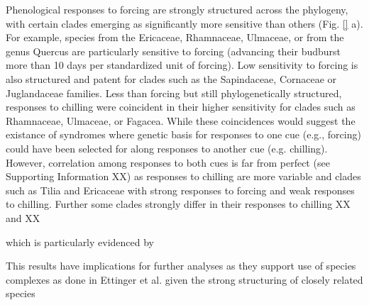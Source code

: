 \documentclass{article}\usepackage[]{graphicx}\usepackage[]{color}
\begin{document}
Phenological responses to forcing are strongly structured across the phylogeny, with certain clades emerging as significantly more sensitive than others (Fig. \ref{} a). For example, species from the Ericaceae, Rhamnaceae, Ulmaceae, or from the genus Quercus are particularly sensitive to forcing (advancing their budburst more than 10 days per standardized unit of forcing). Low sensitivity to forcing is also structured and patent for clades such as the     Sapindaceae, Cornaceae or Juglandaceae families. Less than forcing but still phylogenetically structured, responses to chilling were coincident in their higher sensitivity for clades such as Rhamnaceae, Ulmaceae, or Fagacea. While these coincidences would suggest the existance of syndromes where genetic basis for responses to one cue (e.g., forcing) could have been selected for along responses to another cue (e.g. chilling). However, correlation among responses to both cues is far from perfect (see Supporting Information XX) as responses to chilling are more variable and clades such as Tilia  and Ericaceae with strong responses to forcing and weak responses to chilling. Further some clades strongly differ in their responses to chilling XX and XX

which is particularly  evidenced by 

This results have implications for further analyses as they support use of species complexes as done in Ettinger et al. given the strong structuring of closely related species




\end{document}
